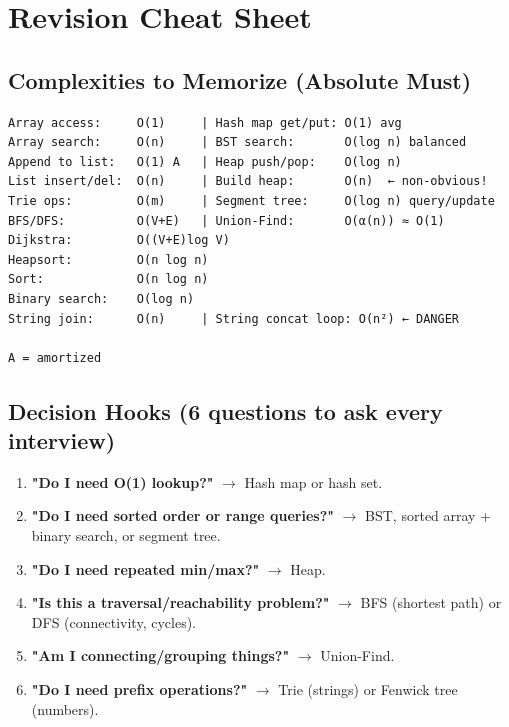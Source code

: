 \documentclass[11pt]{article}
\providecommand{\tightlist}{\setlength{\itemsep}{1pt}\setlength{\parskip}{0pt}}
\begin{document}
\section{Revision Cheat Sheet}\label{revision-cheat-sheet}

\subsection{Complexities to Memorize (Absolute Must)}\label{complexities-to-memorize-absolute-must}

\setcodelang{}

\begin{verbatim}
Array access:     O(1)     | Hash map get/put: O(1) avg
Array search:     O(n)     | BST search:       O(log n) balanced
Append to list:   O(1) A   | Heap push/pop:    O(log n)
List insert/del:  O(n)     | Build heap:       O(n)  ← non-obvious!
Trie ops:         O(m)     | Segment tree:     O(log n) query/update
BFS/DFS:          O(V+E)   | Union-Find:       O(α(n)) ≈ O(1)
Dijkstra:         O((V+E)log V)
Heapsort:         O(n log n)
Sort:             O(n log n)
Binary search:    O(log n)
String join:      O(n)     | String concat loop: O(n²) ← DANGER

A = amortized
\end{verbatim}

\subsection{Decision Hooks (6 questions to ask every interview)}\label{decision-hooks-6-questions-to-ask-every-interview}

\begin{enumerate}
\def\labelenumi{\arabic{enumi}.}
\tightlist
\item
  \textbf{"Do I need O(1) lookup?"} \(\rightarrow\) Hash map or hash set.
\item
  \textbf{"Do I need sorted order or range queries?"} \(\rightarrow\) BST, sorted array + binary search, or segment tree.
\item
  \textbf{"Do I need repeated min/max?"} \(\rightarrow\) Heap.
\item
  \textbf{"Is this a traversal/reachability problem?"} \(\rightarrow\) BFS (shortest path) or DFS (connectivity, cycles).
\item
  \textbf{"Am I connecting/grouping things?"} \(\rightarrow\) Union-Find.
\item
  \textbf{"Do I need prefix operations?"} \(\rightarrow\) Trie (strings) or Fenwick tree (numbers).
\end{enumerate}
\end{document}
